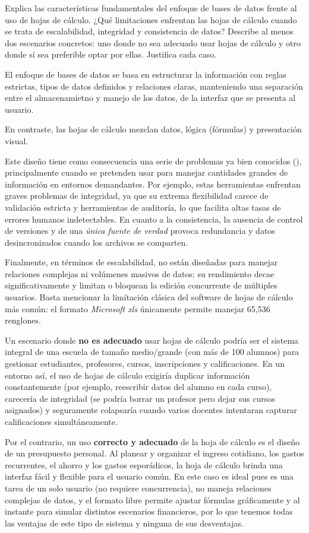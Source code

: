 \item Explica las características fundamentales del enfoque de bases de datos frente al uso de hojas de cálculo. ¿Qué limitaciones enfrentan las hojas de cálculo cuando se trata de escalabilidad, integridad y consistencia de datos? Describe al menos dos escenarios concretos: uno donde no sea adecuado usar hojas de cálculo y otro donde sí sea preferible optar por ellas. Justifica cada caso.


El enfoque de bases de datos se basa en estructurar la información con reglas estrictas, tipos de datos definidos y relaciones claras, manteniendo una separación entre el almacenamietno y manejo de los datos, de la interfaz que se presenta al usuario.

En contraste, las hojas de cálculo mezclan datos, lógica (fórmulas) y presentación visual.

Este diseño tiene como consecuencia una serie de problemas ya bien conocidos (\cite{wiki_spreadsheet}), principalmente cuando se pretenden usar para manejar cantidades grandes de información en entornos demandantes.
Por ejemplo, estas herramientas enfrentan graves problemas de integridad, ya que su extrema flexibilidad carece de validación estricta y herramientas de auditoría, lo que facilita altas tasas de errores humanos indetectables.
En cuanto a la consistencia, la ausencia de control de versiones y de una \emph{única fuente de verdad} provoca redundancia y datos desincronizados cuando los archivos se comparten.

Finalmente, en términos de escalabilidad, no están diseñadas para manejar relaciones complejas ni volúmenes masivos de datos; su rendimiento decae significativamente y limitan o bloquean la edición concurrente de múltiples usuarios. Basta mencionar la limítación clásica del software de hojas de cálculo más común: el formato \emph{Microsoft xls} únicamente permite manejar 65,536 renglones.

Un escenario donde \textbf{no es adecuado} usar hojas de cálculo podría ser el sistema integral de una escuela de tamaño medio/grande (con más de 100 alumnos) para gestionar estudiantes, profesores, cursos, inscripciones y calificaciones.
En un entorno así, el uso de hojas de cálculo exigiría duplicar información constantemente (por ejemplo, reescribir datos del alumno en cada curso), carecería de integridad (se podría borrar un profesor pero dejar sus cursos asignados) y seguramente colapsaría cuando varios docentes intentaran capturar calificaciones simultáneamente.

Por el contrario, un uso \textbf{correcto y adecuado} de la hoja de cálculo es el diseño de un presupuesto personal.
Al planear y organizar el ingreso cotidiano, los gastos recurrentes, el ahorro y los gastos esporádicos, la hoja de cálculo brinda una interfaz fácil y flexible para el usuario común.
En este caso es ideal pues es una tarea de un solo usuario (no requiere concurrencia), no maneja relaciones complejas de datos, y el formato libre permite ajustar fórmulas gráficamente y al instante para simular distintos escenarios financieros, por lo que tenemos todas las ventajas de este tipo de sistema y ninguna de sus desventajas.





